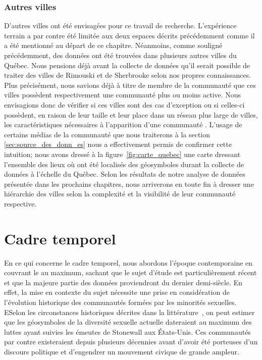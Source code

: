 \subsubsection{Autres villes}
\label{ssub:autres_villes}
D'autres villes ont été envisagées pour ce travail de recherche. 
L'expérience terrain a par contre été limitée aux deux espaces décrits précédemment comme il a été mentionné au départ de ce chapitre. 
Néanmoins, comme souligné précédemment, des données ont été trouvées dans plusieurs autres villes du Québec. 
Nous pensions déjà avant la collecte de données qu'il serait possible de traiter des villes de Rimouski et de Sherbrooke selon nos propres connaissances. 
Plus précisément, nous savions déjà à titre de membre de la communauté \lgbt{} que ces villes possèdent respectivement une communauté plus ou moins active. 
Nous envisagions donc de vérifier si ces villes sont des cas d'exception ou si celles-ci possèdent, en raison de leur taille et leur place dans un réseau plus large de villes, les caractéristiques nécessaires à l'apparition d'une communauté \lgbt.
L'usage de certains médias de la communauté que nous traiterons à la section \ref{sec:source_des_donn_es} nous a effectivement permis de confirmer cette intuition; nous avons dressé à la figure~\ref{fig:carte_quebec} une carte dressant l'ensemble des lieux où ont été localisés des géosymboles durant la collecte de données à l'échelle du Québec. 
Selon les résultats de notre analyse de données présentée dans les prochains chapitres, nous arriverons en toute fin à dresser une hiérarchie des villes selon la complexité et la visibilité de leur communauté respective.

\section{Cadre temporel}
\label{sec:cadre_temporel}
En ce qui concerne le cadre temporel, nous abordons l'époque contemporaine en couvrant le  au maximum, sachant que le sujet d'étude est particulièrement récent et que la majeure partie des données proviendront du dernier demi-siècle. 
En effet, la mise en contexte du sujet nécessite une prise en considération de l'évolution historique des communautés formées par les minorités sexuelles. 
ESelon les circonstances historiques décrites dans la littérature~\citep{Spencer2005}, on peut estimer que les géosymboles de la diversité sexuelle actuelle dateraient au maximum des luttes ayant suivies les émeutes de Stonewall aux États-Unis.
Ces communautés par contre existeraient depuis plusieurs décennies avant d'avoir été porteuses d'un discours politique et d'engendrer un mouvement civique de grande ampleur.

